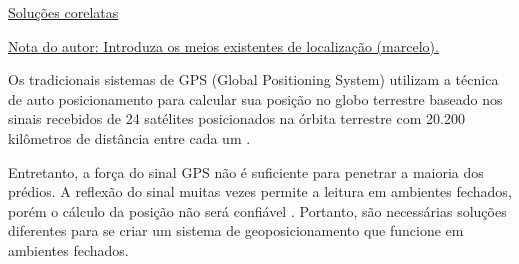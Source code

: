 \documentclass[
	12pt,				%
	openright,			%
	oneside,			%
	a4paper,			%
	chapter=TITLE,		%
	english,			%
	french,				%
	spanish,			%
	brazil				%
	]{abntex2}
\begin{document}
{%








\underline{Soluções corelatas}

\underline{Nota do autor: Introduza os meios existentes de localização (marcelo).}


Os tradicionais sistemas de GPS (Global Positioning System) utilizam a técnica
de auto posicionamento para calcular sua posição no globo terrestre baseado nos
sinais recebidos de 24 satélites posicionados na órbita terrestre com 20.200
kilômetros de distância entre cada um \cite{Djuknic2001}.


Entretanto, a força do sinal GPS não é suficiente para penetrar a maioria dos
prédios. A reflexão do sinal muitas vezes permite a leitura em ambientes
fechados, porém o cálculo da posição não será confiável
\cite{Dartmouth2000}. Portanto, são necessárias soluções diferentes para
se criar um sistema de geoposicionamento que funcione em ambientes fechados.


}
\end{document}
